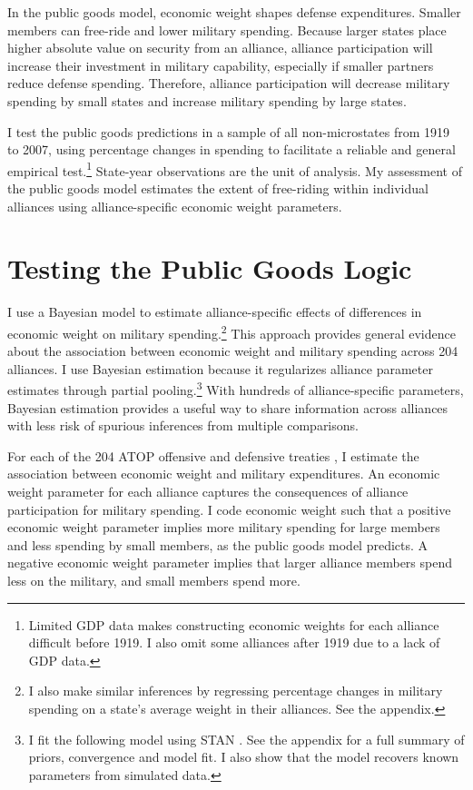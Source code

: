 \documentclass[12pt]{article}
\begin{document}
In the public goods model, economic weight shapes defense expenditures. 
Smaller members can free-ride and lower military spending. 
Because larger states place higher absolute value on security from an alliance, alliance participation will increase their investment in military capability, especially if smaller partners reduce defense spending. 
Therefore, alliance participation will decrease military spending by small states and increase military spending by large states. 


I test the public goods predictions in a sample of all non-microstates from 1919 to 2007, using percentage changes in spending to facilitate a reliable and general empirical test.\footnote{Limited GDP data makes constructing economic weights for each alliance difficult before 1919. I also omit some alliances after 1919 due to a lack of GDP data.}
State-year observations are the unit of analysis.
My assessment of the public goods model estimates the extent of free-riding within individual alliances using alliance-specific economic weight parameters.  
 

\section{Testing the Public Goods Logic}


I use a Bayesian model to estimate alliance-specific effects of differences in economic weight on military spending.\footnote{I also make similar inferences by regressing percentage changes in military spending on a state's average weight in their alliances. See the appendix.}
This approach provides general evidence about the association between economic weight and military spending across 204 alliances.
I use Bayesian estimation because it regularizes alliance parameter estimates through partial pooling.\footnote{I fit the following model using STAN \citep{Carpenteretal2016}. See the appendix for a full summary of priors, convergence and model fit. I also show that the model recovers known parameters from simulated data.}
With hundreds of alliance-specific parameters, Bayesian estimation provides a useful way to share information across alliances with less risk of spurious inferences from multiple comparisons. 


For each of the 204 ATOP offensive and defensive treaties \citep{Leedsetal2002}, I estimate the association between economic weight and military expenditures. 
An economic weight parameter for each alliance captures the consequences of alliance participation for military spending. 
I code economic weight such that a positive economic weight parameter implies more military spending for large members and less spending by small members, as the public goods model predicts. 
A negative economic weight parameter implies that larger alliance members spend less on the military, and small members spend more. 
\end{document}
